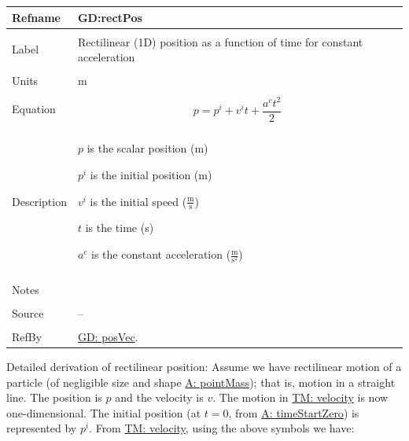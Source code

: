 \documentclass[12pt]{article}
\begin{document}
\noindent \begin{minipage}{\textwidth}
\begin{tabular}{p{} p{}}
\toprule \textbf{Refname} & \textbf{GD:rectPos}
\label{GD:rectPos}
\\ \midrule \\
Label & Rectilinear (1D) position as a function of time for constant acceleration
\\ \midrule \\
Units & m
\\ \midrule \\
Equation & \begin{displaymath}
           p={p^{i}}+{v^{i}} t+\frac{{a^{c}} t^{2}}{2}
           \end{displaymath}
\\ \midrule \\
Description & \begin{symbDescription}
              \item{$p$ is the scalar position (m)}
              \item{${p^{i}}$ is the initial position (m)}
              \item{${v^{i}}$ is the initial speed ($\frac{\text{m}}{\text{s}}$)}
              \item{$t$ is the time (s)}
              \item{${a^{c}}$ is the constant acceleration ($\frac{\text{m}}{\text{s}^{2}}$)}
              \end{symbDescription}
\\ \midrule \\
Notes & 
\\ \midrule \\
Source & --
\\ \midrule \\
RefBy & \hyperref[GD:posVec]{GD: posVec}.
\\ \bottomrule \end{tabular}
\end{minipage}
Detailed derivation of rectilinear position:
Assume we have rectilinear motion of a particle (of negligible size and shape \hyperref[pointMass]{A: pointMass}); that is, motion in a straight line. The position is $p$ and the velocity is $v$. The motion in \hyperref[TM:velocity]{TM: velocity} is now one-dimensional. The initial position (at $t=0$, from \hyperref[timeStartZero]{A: timeStartZero}) is represented by ${p^{i}}$. From \hyperref[TM:velocity]{TM: velocity}, using the above symbols we have:
\end{document}
